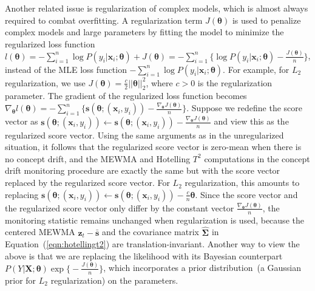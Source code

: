 \documentclass[twoside,11pt]{article}
\begin{document}
Another related issue is regularization of complex models, which is almost always required to combat overfitting. A regularization term $J(\bm{\theta})$ is used to penalize complex models and large parameters by fitting the model to minimize the regularized loss function $l(\bm{\theta}) = -\sum_{i=1}^n \log P(y_i|\bm{x}_i;\bm{\theta}) + J(\bm{\theta}) = - \sum_{i=1}^n \big\{ \log P(y_i|\bm{x}_i;\bm{\theta}) - \frac{J(\bm{\theta})}{n}\big\}$, instead of the MLE loss function $-\sum_{i=1}^n \log P(y_i|\bm{x}_i;\bm{\theta})$. For example, for $L_2$ regularization, we use $J(\bm{\theta}) = \frac{c}{2}||\bm{\theta}||_2^2$, where $c>0$ is the regularization parameter. The gradient of the regularized loss function becomes $\nabla_{\bm{\theta}}l(\bm{\theta}) = - \sum_{i=1}^n \big\{ \bm{s}(\bm{\theta};(\bm{x}_i,y_i))-\frac{\nabla_{\bm{\theta}}J(\bm{\theta})}{n} \big\}$. Suppose we redefine the score vector as $\bm{s}(\bm{\theta};(\bm{x}_i,y_i)) \leftarrow \bm{s}(\bm{\theta};(\bm{x}_i,y_i)) -\frac{\nabla_{\bm{\theta}}J(\bm{\theta})}{n}$ and view this as the regularized score vector. Using the same arguments as in the unregularized situation, it follows that the regularized score vector is zero-mean when there is no concept drift, and the MEWMA and Hotelling $T^2$ computations in the concept drift monitoring procedure are exactly the same but with the score vector replaced by the regularized score vector. For $L_2$ regularization, this amounts to replacing $\bm{s}(\bm{\theta};(\bm{x}_i,y_i)) \leftarrow \bm{s}(\bm{\theta};(\bm{x}_i,y_i)) - \frac{c}{n}\bm{\theta}$. Since the score vector and the regularized score vector only differ by the constant vector $\frac{\nabla_{\bm{\theta}}J(\bm{\theta})}{n}$, the monitoring statistic remains unchanged when regularization is used, because the centered MEWMA $\bm {z}_t-\bar { \bm {s}}$ and the covariance matrix $\widehat {\bm{\Sigma}}$ in Equation~(\ref{eqn:hotellingt2}) are translation-invariant. Another way to view the above is that we are replacing the likelihood with its Bayesian counterpart $P(Y|\bm{X};\bm{\theta})\exp\big\{-\frac{J(\bm{\theta})}{n}\big\}$, which incorporates a prior distribution~(a Gaussian prior for $L_2$ regularization) on the parameters.
\end{document}
